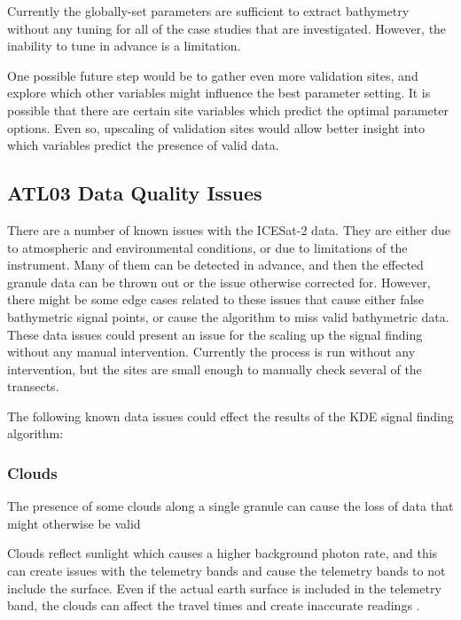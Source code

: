 Currently the globally-set parameters are sufficient to extract bathymetry without any tuning for all of the case studies that are investigated. However, the inability to tune in advance is a limitation. 

One possible future step would be to gather even more validation sites, and explore which other variables might influence the best parameter setting. It is possible that there are certain site variables which predict the optimal parameter options. Even so, upscaling of validation sites would allow better insight into which variables predict the presence of valid data.  

\subsection{ATL03 Data Quality Issues}\label{sec:discussion-photon-issues}

There are a number of known issues with the ICESat-2 data. They are either due to atmospheric and environmental conditions, or due to limitations of the instrument. Many of them can be detected in advance, and then the effected granule data can be thrown out or the issue otherwise corrected for. However, there might be some edge cases related to these issues that cause either false bathymetric signal points, or cause the algorithm to miss valid bathymetric data. These data issues could present an issue for the scaling up the signal finding without any manual intervention. Currently the process is run without any intervention, but the sites are small enough to manually check several of the transects.

The following known data issues could effect the results of the KDE signal finding algorithm:

\subsubsection{Clouds}


The presence of some clouds along a single granule can cause the loss of data that might otherwise be valid

Clouds reflect sunlight which causes a higher background photon rate, and this can create issues with the telemetry bands and cause the telemetry bands to not include the surface. Even if the actual earth surface is included in the telemetry band, the clouds can affect the travel times and create inaccurate readings \parencite{atl03knownissues}.

